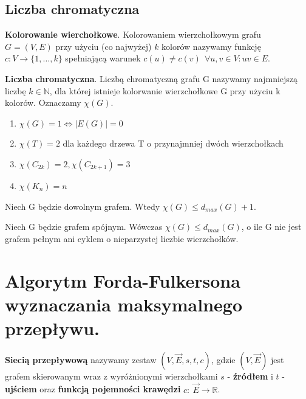 \documentclass[12pt]{article}
\begin{document}
    \subsection{Liczba chromatyczna}
    \begin{definition}
        \textbf{Kolorowanie wierchołkowe}. Kolorowaniem wierzchołkowym grafu $G = (V, E)$ przy użyciu (co najwyżej) $k$
        kolorów nazywamy funkcję $c: V \rightarrow \{1, \dots, k\}$ spełniającą warunek
        $c(u) \neq c(v) ~~ \forall u, v \in V : uv \in E$.
    \end{definition}

    \begin{definition}
        \textbf{Liczba chromatyczna}. Liczbą chromatyczną grafu G nazywamy najmniejszą liczbę $k \in \mathbb{N}$, dla
        której istnieje kolorwanie wierzchołkowe G przy użyciu k kolorów. Oznaczamy $\chi(G)$.
        \begin{enumerate}
            \item $\chi(G) = 1 \Leftrightarrow |E(G)| = 0$
            \item $\chi(T) = 2$ dla każdego drzewa T o przynajmniej dwóch wierzchołkach
            \item $\chi(C_{2k}) = 2, \chi(C_{2k+1}) = 3$
            \item $\chi(K_n) = n$
        \end{enumerate}
    \end{definition}

    \begin{theorem}
        Niech G będzie dowolnym grafem. Wtedy $\chi(G) \leq d_{max}(G) + 1$.
    \end{theorem}

    \begin{theorem}
        Niech G będzie grafem spójnym. Wówczas $\chi(G) \leq d_{max}(G)$, o ile G nie jest grafem pełnym ani cyklem o
        nieparzystej liczbie wierzchołków.
    \end{theorem}

    \newpage

    \section{Algorytm Forda-Fulkersona wyznaczania maksymalnego przepływu.}

    \begin{definition}
        \textbf{Siecią przepływową} nazywamy zestaw $(V, \vec{E}, s, t, c)$, gdzie $(V, \vec{E})$ jest grafem
        skierowanym wraz z wyróżnionymi wierzchołkami $s$ - \textbf{źródłem} i $t$ - \textbf{ujściem} oraz
        \textbf{funkcją pojemności krawędzi} $c: ~ \vec{E} \rightarrow \mathbb{R}$.
    \end{definition}
\end{document}
